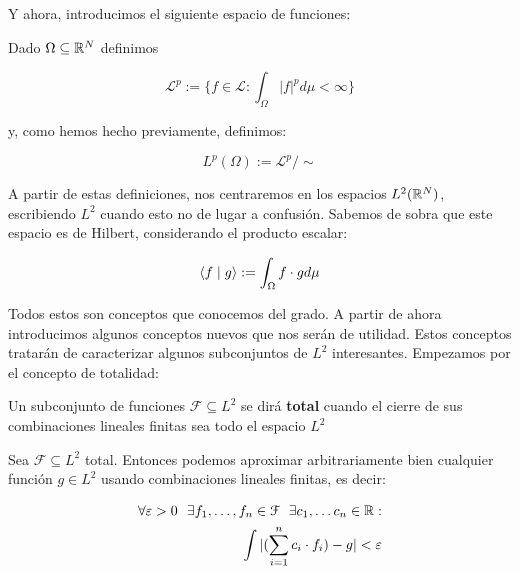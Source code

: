 Y ahora, introducimos el siguiente espacio de funciones:

\begin{definicion}
    Dado $\Omega \subseteq \mathbb{R}^N$ definimos

    \begin{equation}
        \mathcal{L}^p := \{ f \in \mathcal{L} : \int_{\Omega} |f|^p d\mu < \infty \}
    \end{equation}

    y, como hemos hecho previamente, definimos:

    \begin{equation}
        L^p(\Omega) := \mathcal{L}^p / \sim
    \end{equation}

\end{definicion}

A partir de estas definiciones, nos centraremos en los espacios $L^2(\mathbb{R}^N)$, escribiendo $L^2$ cuando esto no de lugar a confusión. Sabemos de sobra que este espacio es de Hilbert, considerando el producto escalar:

\begin{equation}
    \langle f \; | \; g \rangle := \int_{\Omega} f \cdot g d\mu
\end{equation}

Todos estos son conceptos que conocemos del grado. A partir de ahora introducimos algunos conceptos nuevos que nos serán de utilidad. Estos conceptos tratarán de caracterizar algunos subconjuntos de $L^2$ interesantes. Empezamos por el concepto de totalidad:

\begin{definicion}
    Un subconjunto de funciones $\mathcal{F} \subseteq L^2$ se dirá \textbf{total} cuando el cierre de sus combinaciones lineales finitas sea todo el espacio $L^2$
\end{definicion}

\begin{proposicion} \label{prop:conjuntos_totales_epsilon_aproximacion}
    Sea $\mathcal{F} \subseteq L^2$ total. Entonces podemos aproximar arbitrariamente bien cualquier función $g \in L^2$ usando combinaciones lineales finitas, es decir:

    \begin{equation} \label{eq:conjuntos_totales_epsilon_aproximacion}
    \begin{split}
        \forall \varepsilon > 0 \ \  \exists f_1, \ldots, f_n \in \mathcal{F} \ \  \exists c_1, \ldots c_n \in \mathbb{R}:\\
        \int | (\sum_{i = 1}^n c_i \cdot f_i) - g| < \varepsilon \\
    \end{split}
    \end{equation}

\end{proposicion}

